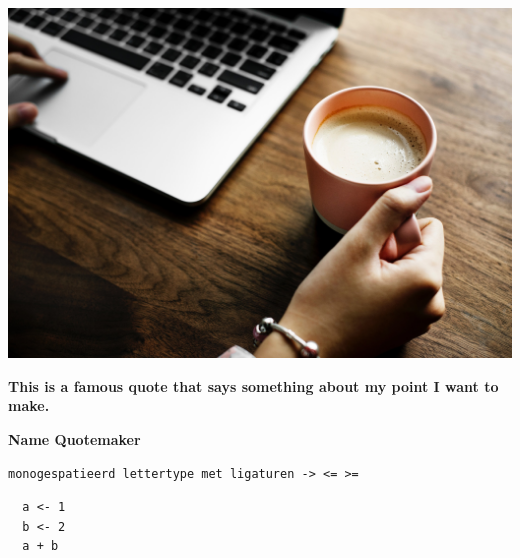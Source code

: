 \documentclass[aspectratio=169]{beamer}
\begin{document}
\begin{frame}
  \includegraphics[width=\textwidth]{img/beverage-coffee-computer-984536.jpg}
\end{frame}


\begin{frame}

  {\huge \textbf{This is a famous quote that says something about my point I want to make.}}
  
  \bigskip
  
  \textbf{Name Quotemaker}

\end{frame}

\begin{frame}[fragile]
  \texttt{monogespatieerd lettertype met ligaturen -> <= >=}

  \begin{verbatim}
  a <- 1
  b <- 2
  a + b
  \end{verbatim}
\end{frame}
\end{document}
